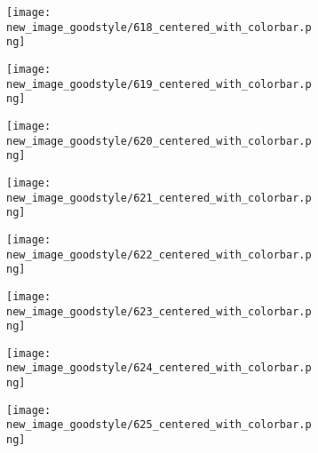 \documentclass[a4paper,12pt]{article}
\begin{document}
\begin{figure}[H]
  \begin{subfigure}{0.11\textwidth}
    \texttt{[image: new\_image\_goodstyle/618\_centered\_with\_colorbar.png]}
  \end{subfigure}
  \hfill
  \begin{subfigure}{0.11\textwidth}
    \texttt{[image: new\_image\_goodstyle/619\_centered\_with\_colorbar.png]}
  \end{subfigure}
  \hfill
  \begin{subfigure}{0.11\textwidth}
    \texttt{[image: new\_image\_goodstyle/620\_centered\_with\_colorbar.png]}
  \end{subfigure}
  \hfill
  \begin{subfigure}{0.11\textwidth}
    \texttt{[image: new\_image\_goodstyle/621\_centered\_with\_colorbar.png]}
  \end{subfigure}
  \hfill
  \begin{subfigure}{0.11\textwidth}
    \texttt{[image: new\_image\_goodstyle/622\_centered\_with\_colorbar.png]}
  \end{subfigure}
  \hfill
  \begin{subfigure}{0.11\textwidth}
    \texttt{[image: new\_image\_goodstyle/623\_centered\_with\_colorbar.png]}
  \end{subfigure}
  \hfill
  \begin{subfigure}{0.11\textwidth}
    \texttt{[image: new\_image\_goodstyle/624\_centered\_with\_colorbar.png]}
  \end{subfigure}
  \hfill
  \begin{subfigure}{0.11\textwidth}
    \texttt{[image: new\_image\_goodstyle/625\_centered\_with\_colorbar.png]}
  \end{subfigure}
  \hfill
\end{figure}
\end{document}
